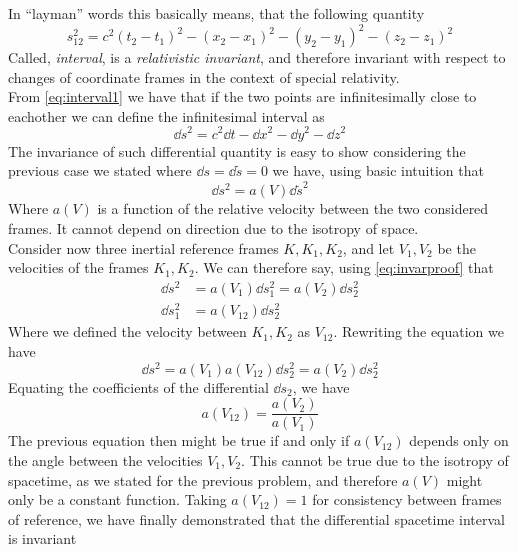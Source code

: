 \documentclass[../electromagnetism.tex]{subfiles}
\begin{document}
In ``layman'' words this basically means, that the following quantity
\begin{equation}
	s^2_{12}=c^2(t_2-t_1)^2-(x_2-x_1)^2-(y_2-y_1)^2-(z_2-z_1)^2
	\label{eq:intervalsr}
\end{equation}
Called, \emph{interval}, is a \emph{relativistic invariant}, and therefore invariant with respect to changes of coordinate frames in the context of special relativity.\\
From \eqref{eq:interval1} we have that if the two points are infinitesimally close to eachother we can define the infinitesimal interval as
\begin{equation}
	\dd s^2=c^2\dd t-\dd x^2-\dd y^2-\dd z^2
	\label{eq:diffint}
\end{equation}
The invariance of such differential quantity is easy to show considering the previous case we stated where $\dd s=\dd\tilde{s}=0$ we have, using basic intuition that
\begin{equation}
	\dd s^2=a(V)\dd\tilde{s}^2
	\label{eq:invarproof}
\end{equation}
Where $a(V)$ is a function of the relative velocity between the two considered frames. It cannot depend on direction due to the isotropy of space.\\
Consider now three inertial reference frames $K,K_1,K_2$, and let $V_1,V_2$ be the velocities of the frames $K_1,K_2$. We can therefore say, using \eqref{eq:invarproof} that
\begin{equation}
	\begin{aligned}
		\dd s^2&=a(V_1)\dd s^2_1=a(V_2)\dd s^2_2\\
		\dd s^2_1&=a(V_{12})\dd s^2_2
	\end{aligned}
	\label{eq:invarproof2}
\end{equation}
Where we defined the velocity between $K_1,K_2$ as $V_{12}$. Rewriting the equation we have
\begin{equation*}
	\dd s^2=a(V_1)a(V_{12})\dd s^2_2=a(V_2)\dd s^2_2
\end{equation*}
Equating the coefficients of the differential $\dd s_2$, we have
\begin{equation}
	a(V_{12})=\frac{a(V_2)}{a(V_1)}
	\label{eq:v12lreq}
\end{equation}
The previous equation then might be true if and only if $a(V_{12})$ depends only on the angle between the velocities $V_1,V_2$. This cannot be true due to the isotropy of spacetime, as we stated for the previous problem, and therefore $a(V)$ might only be a constant function. Taking $a(V_{12})=1$ for consistency between frames of reference, we have finally demonstrated that the differential spacetime interval is invariant
\end{document}
